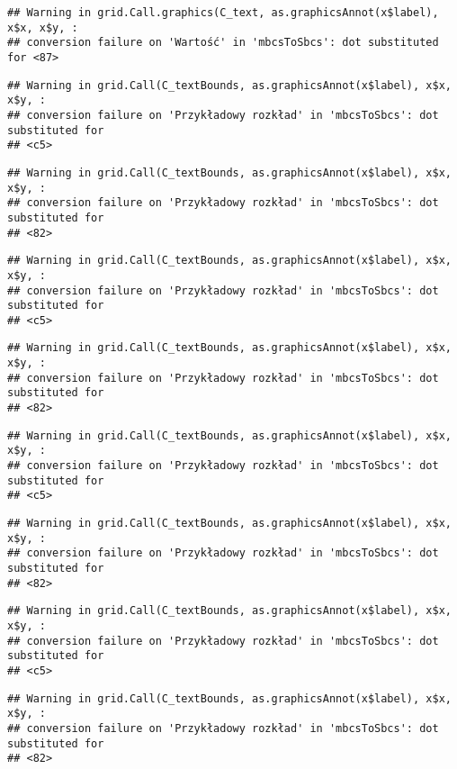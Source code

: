 \documentclass[
]{book}
\begin{document}
\begin{verbatim}
## Warning in grid.Call.graphics(C_text, as.graphicsAnnot(x$label), x$x, x$y, :
## conversion failure on 'Wartość' in 'mbcsToSbcs': dot substituted for <87>
\end{verbatim}

\begin{verbatim}
## Warning in grid.Call(C_textBounds, as.graphicsAnnot(x$label), x$x, x$y, :
## conversion failure on 'Przykładowy rozkład' in 'mbcsToSbcs': dot substituted for
## <c5>
\end{verbatim}

\begin{verbatim}
## Warning in grid.Call(C_textBounds, as.graphicsAnnot(x$label), x$x, x$y, :
## conversion failure on 'Przykładowy rozkład' in 'mbcsToSbcs': dot substituted for
## <82>
\end{verbatim}

\begin{verbatim}
## Warning in grid.Call(C_textBounds, as.graphicsAnnot(x$label), x$x, x$y, :
## conversion failure on 'Przykładowy rozkład' in 'mbcsToSbcs': dot substituted for
## <c5>
\end{verbatim}

\begin{verbatim}
## Warning in grid.Call(C_textBounds, as.graphicsAnnot(x$label), x$x, x$y, :
## conversion failure on 'Przykładowy rozkład' in 'mbcsToSbcs': dot substituted for
## <82>
\end{verbatim}

\begin{verbatim}
## Warning in grid.Call(C_textBounds, as.graphicsAnnot(x$label), x$x, x$y, :
## conversion failure on 'Przykładowy rozkład' in 'mbcsToSbcs': dot substituted for
## <c5>
\end{verbatim}

\begin{verbatim}
## Warning in grid.Call(C_textBounds, as.graphicsAnnot(x$label), x$x, x$y, :
## conversion failure on 'Przykładowy rozkład' in 'mbcsToSbcs': dot substituted for
## <82>
\end{verbatim}

\begin{verbatim}
## Warning in grid.Call(C_textBounds, as.graphicsAnnot(x$label), x$x, x$y, :
## conversion failure on 'Przykładowy rozkład' in 'mbcsToSbcs': dot substituted for
## <c5>
\end{verbatim}

\begin{verbatim}
## Warning in grid.Call(C_textBounds, as.graphicsAnnot(x$label), x$x, x$y, :
## conversion failure on 'Przykładowy rozkład' in 'mbcsToSbcs': dot substituted for
## <82>
\end{verbatim}
\end{document}
